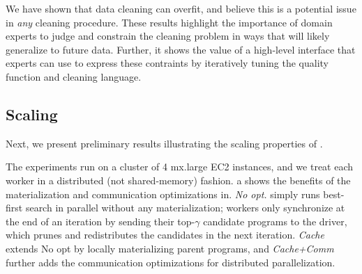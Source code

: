  We have shown that data cleaning can overfit, and believe this is a potential issue in {\it any} cleaning procedure. These results highlight the importance of domain experts to judge and constrain the cleaning problem in ways that will likely generalize to future data. Further, it shows the value of a high-level interface that experts can use to express these contraints by iteratively tuning the quality function and cleaning language. 



\subsection*{Scaling}
Next, we present preliminary results illustrating the scaling properties of \sys. 

\vspace{1em}

 The experiments run on a cluster of 4 mx.large EC2 instances, and we treat each worker in a distributed (not shared-memory) fashion.   a shows the benefits of the materialization and communication optimizations in.  {\it No opt.} simply runs best-first search in parallel without any materialization; workers only synchronize at the end of an iteration by sending their top-$\gamma$ candidate programs to the driver, which prunes and redistributes the candidates in the next iteration.  {\it Cache} extends No opt by locally materializing parent programs, and {\it Cache+Comm} further adds the communication optimizations for distributed parallelization.   

